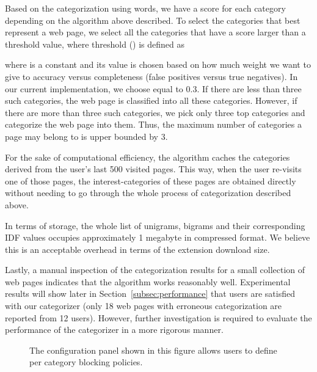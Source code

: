 \documentclass[conference]{IEEEtran}
\begin{document}
Based on the categorization using words, we have a score for each category depending on the algorithm above described.
To select the categories that best represent a web page, we select all the categories that have a score larger than a threshold value, where threshold () is defined as

where   is a constant and its value is chosen based on how much weight we want to give to accuracy versus completeness (false positives versus true negatives).
In our current implementation, we choose  equal to 0.3.
If there are less than three such categories, the web page is classified into all these categories.
However, if there are more than three such categories, we pick only three top categories and categorize the web page into them.
Thus, the maximum number of categories a page may belong to is upper bounded by 3.

For the sake of computational efficiency, the algorithm caches the categories derived from the user's last 500 visited pages. 
This way, when the user re-visits one of those pages, the interest-categories of these pages are obtained directly without needing to go through the whole process of categorization described above.

In terms of storage, the whole list of unigrams, bigrams and their corresponding IDF values occupies approximately 1 megabyte in compressed format. 
We believe this is an acceptable overhead in terms of the extension download size.

Lastly, a manual inspection of the categorization results for a small collection of web pages indicates that the algorithm works reasonably well. 
Experimental results will show later in Section~\ref{subsec:performance} that users are satisfied with our categorizer (only 18 web pages with erroneous categorization are reported from 12 users).
However, further investigation is required to evaluate the performance of the categorizer in a more rigorous manner.



\begin{figure}[t]
\centering
{}
\caption{The configuration panel shown in this figure allows users to define per category blocking policies.}
\label{fig:CatPolicyPanel}
\end{figure}
\end{document}
